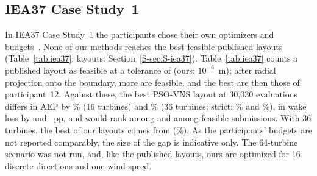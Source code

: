 
\subsection{IEA37 Case Study~1}
\label{sec:iea37}


In IEA37 Case Study~1 the participants chose their own optimizers and budgets~\cite{Baker2019}. None of our methods reaches the best feasible published layouts (Table~\ref{tab:iea37}; layouts: Section~\ref{S-sec:S-iea37}). Table~\ref{tab:iea37} counts a published layout as feasible at a tolerance of \NFIEATolStrict{} (ours: $10^{-6}$~m); after radial projection onto the boundary, \NFIEANChanged{} more are feasible, and the best are then those of participant~12. Against these, the best PSO-VNS layout at 30,030 evaluations differs in AEP by \NFIEAGapSixteenThirtyKProj\% (16 turbines) and \NFIEAGapThirtySixThirtyKProj\% (36 turbines; strict: \NFIEAGapSixteenThirtyKStrict\% and \NFIEAGapThirtySixThirtyKStrict\%), in wake loss by \NFIEAGapLossSixteenThirtyKProj{} and \NFIEAGapLossThirtySixThirtyKProj~pp, and would rank \NFIEARankSixteenThirtyKProj{} among \NFIEAPubFeasProjSixteen{} and \NFIEARankThirtySixThirtyKProj{} among \NFIEAPubFeasProjThirtySix{} feasible submissions. With 36 turbines, the best of our layouts comes from \NFIEAOurBestByThirtySixThirtyK{} (\NFIEAOurBestGapThirtySixThirtyKProj\%). As the participants' budgets are not reported comparably, the size of the gap is indicative only. The 64-turbine scenario was not run, and, like the published layouts, ours are optimized for 16 discrete directions and one wind speed.

